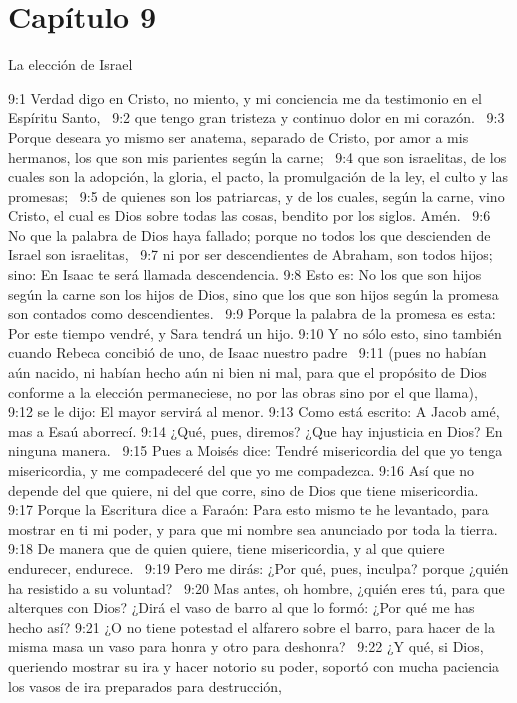\section*{Capítulo 9}
La elección de Israel  

9:1 Verdad digo en Cristo, no miento, y mi conciencia me da testimonio en el Espíritu Santo,  
9:2 que tengo gran tristeza y continuo dolor en mi corazón.  
9:3 Porque deseara yo mismo ser anatema, separado de Cristo, por amor a mis hermanos, los que son mis parientes según la carne;  
9:4 que son israelitas, de los cuales son la adopción, la gloria, el pacto, la promulgación de la ley, el culto y las promesas;  
9:5 de quienes son los patriarcas, y de los cuales, según la carne, vino Cristo, el cual es Dios sobre todas las cosas, bendito por los siglos. Amén.  
9:6 No que la palabra de Dios haya fallado; porque no todos los que descienden de Israel son israelitas,  
9:7 ni por ser descendientes de Abraham, son todos hijos; sino: En Isaac te será llamada descendencia. 
9:8 Esto es: No los que son hijos según la carne son los hijos de Dios, sino que los que son hijos según la promesa son contados como descendientes.  
9:9 Porque la palabra de la promesa es esta: Por este tiempo vendré, y Sara tendrá un hijo. 
9:10 Y no sólo esto, sino también cuando Rebeca concibió de uno, de Isaac nuestro padre  
9:11 (pues no habían aún nacido, ni habían hecho aún ni bien ni mal, para que el propósito de Dios conforme a la elección permaneciese, no por las obras sino por el que llama),  
9:12 se le dijo: El mayor servirá al menor. 
9:13 Como está escrito: A Jacob amé, mas a Esaú aborrecí. 
9:14 ¿Qué, pues, diremos? ¿Que hay injusticia en Dios? En ninguna manera.  
9:15 Pues a Moisés dice: Tendré misericordia del que yo tenga misericordia, y me compadeceré del que yo me compadezca. 
9:16 Así que no depende del que quiere, ni del que corre, sino de Dios que tiene misericordia.  
9:17 Porque la Escritura dice a Faraón: Para esto mismo te he levantado, para mostrar en ti mi poder, y para que mi nombre sea anunciado por toda la tierra. 
9:18 De manera que de quien quiere, tiene misericordia, y al que quiere endurecer, endurece.  
9:19 Pero me dirás: ¿Por qué, pues, inculpa? porque ¿quién ha resistido a su voluntad?  
9:20 Mas antes, oh hombre, ¿quién eres tú, para que alterques con Dios? ¿Dirá el vaso de barro al que lo formó: ¿Por qué me has hecho así? 
9:21 ¿O no tiene potestad el alfarero sobre el barro, para hacer de la misma masa un vaso para honra y otro para deshonra?  
9:22 ¿Y qué, si Dios, queriendo mostrar su ira y hacer notorio su poder, soportó con mucha paciencia los vasos de ira preparados para destrucción,  
